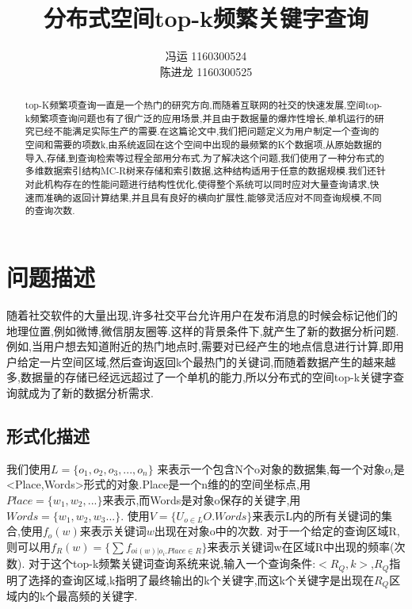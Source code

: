 \documentclass{elegantpaper}
\title{分布式空间top-k频繁关键字查询}
\author{
    冯运 1160300524 %
    \\[0.5ex] %
    陈进龙 1160300525 %
}
\begin{document}
\maketitle

\begin{abstract}
    top-K频繁项查询一直是一个热门的研究方向,而随着互联网的社交的快速发展,空间top-k频繁项查询问题也有了很广泛的应用场景,并且由于数据量的爆炸性增长,单机运行的研究已经不能满足实际生产的需要.在这篇论文中,我们把问题定义为用户制定一个查询的空间和需要的项数k,由系统返回在这个空间中出现的最频繁的K个数据项,从原始数据的导入,存储,到查询检索等过程全部用分布式.为了解决这个问题,我们使用了一种分布式的多维数据索引结构MC-R树来存储和索引数据,这种结构适用于任意的数据规模.我们还针对此机构存在的性能问题进行结构性优化,使得整个系统可以同时应对大量查询请求,快速而准确的返回计算结果,并且具有良好的横向扩展性,能够灵活应对不同查询规模,不同的查询次数.
\end{abstract}

\section{问题描述}

随着社交软件的大量出现,许多社交平台允许用户在发布消息的时候会标记他们的地理位置,例如微博,微信朋友圈等.这样的背景条件下,就产生了新的数据分析问题.例如,当用户想去知道附近的热门地点时,需要对已经产生的地点信息进行计算,即用户给定一片空间区域,然后查询返回k个最热门的关键词,而随着数据产生的越来越多,数据量的存储已经远远超过了一个单机的能力,所以分布式的空间top-k关键字查询就成为了新的数据分析需求.

\subsection{形式化描述}
我们使用$L=\{o_1,o_2,o_3,...,o_n\} $ 来表示一个包含N个o对象的数据集,每一个对象$o_i$是<Place,Words>形式的对象.Place是一个n维的的空间坐标点,用$Place=\{w_1,w_2,...\}$来表示,而Words是对象o保存的关键字,用$Words=\{w_1,w_2,w_3... \}$.\newline
使用$V=\{U_{o\in L}O.Words\}$来表示L内的所有关键词的集合,使用$f_o(w)$来表示关键词$w$出现在对象o中的次数.\newline
对于一个给定的查询区域R,则可以用$f_R(w)=\{\sum{f_{oi(w)|o_i.Place\in R}} \}$来表示关键词w在区域R中出现的频率(次数).\newline
对于这个top-k频繁关键词查询系统来说,输入一个查询条件:$<R_Q,k>$,$R_Q$指明了选择的查询区域,k指明了最终输出的k个关键字,而这k个关键字是出现在$R_Q$区域内的k个最高频的关键字.\newline
\end{document}
